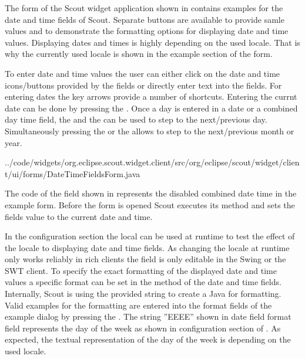 \documentclass[a4paper,10pt,twoside]{book}
\begin{document}
The form  of the Scout widget application shown in  contains examples for the date and time fields of Scout.
Separate buttons are available to provide samle values and to demonstrate the formatting options for displaying date and time values.
Displaying dates and times is highly depending on the used locale.
That is why the currently used locale is shown in the example section of the form.

To enter date and time values the user can either click on the date and time icons/buttons provided by the fields or directly enter text into the fields. 
For entering dates the key arrows provide a number of shortcuts. 
Entering the currnt date can be done by pressing the . 
Once a day is entered in a date or a combined day time field, the  and the  can be used to step to the next/previous day. 
Simultaneously pressing the  or the  allows to step to the next/previous month or year.


{../code/widgets/org.eclipse.scout.widget.client/src/org/eclipse/scout/widget/client/ui/forms/DateTimeFieldsForm.java}

The code of the  field shown in  represents the disabled combined date time in the example form. 
Before the form is opened Scout executes its  method and sets the fields value to the current date and time. 

In the configuration section the local can be used at runtime to test the effect of the locale to displaying date and time fields. 
As changing the locale at runtime only works reliably in rich clients the field is only editable in the Swing or the SWT client. 
To specify the exact formatting of the displayed date and time values a specific format can be set in the  method of the date and time fields. 
Internally, Scout is using the provided string to create a Java  for formatting. 
Valid examples for the formatting are entered into the format fields of the example dialog by pressing the . 
The string ''EEEE'' shown in date field format field represents the day of the week as shown in configuration section of . 
As expected, the textual representation of the day of the week is depending on the used locale. 
\end{document}
